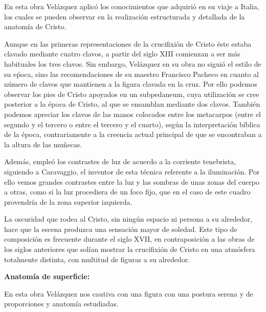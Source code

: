 En esta obra Velázquez aplicó los conocimientos que adquirió en su viaje a Italia, los cuales se pueden observar en la realización estructurada y detallada de la anatomía de Cristo.

Aunque en las primeras representaciones de la crucifixión de Cristo éste estaba clavado mediante cuatro clavos, a partir del siglo XIII comienzan a ser más habituales los tres clavos. Sin embargo, Velázquez en su obra no siguió el estilo de su eṕoca, sino las recomendaciones de su maestro Francisco Pacheco en cuanto al número de clavos que mantienen a la figura clavada en la cruz. Por ello podemos observar los pies de Cristo apoyados en un subpedaneum, cuya utilización se cree posterior a la época de Cristo, al que se ensamblan mediante dos clavos. También podemos apreciar los clavos de las manos colocados entre los metacarpos (entre el segundo y el tercero o entre el tercero y el cuarto), según la interpretación bíblica de la época, contrariamente a la creencia actual principal de que se encontraban a la altura de las muñecas.

Además, empleó los contrastes de luz de acuerdo a la corriente tenebrista, siguiendo a Caravaggio, el inventor de esta técnica referente a la iluminación. Por ello vemos grandes contrastes entre la luz y las sombras de unas zonas del cuerpo a otras, como si la luz procediera de un foco fijo, que en el caso de este cuadro provendría de la zona superior izquierda.

La oscuridad que rodea al Cristo, sin ningún espacio ni persona a su alrededor, hace que la escena produzca una sensación mayor de soledad. Este tipo de composición es frecuente durante el siglo XVII, en contraposición a las obras de los siglos anteriores que solían mostrar la crucifixión de Cristo en una atmósfera totalmente distinta, con multitud de figuras a su alrededor.

\vspace{12pt}
\textbf{Anatomía de superficie:}

En esta obra Velázquez nos cautiva con una figura con una postura serena y de proporciones y anatomía estudiadas. %

